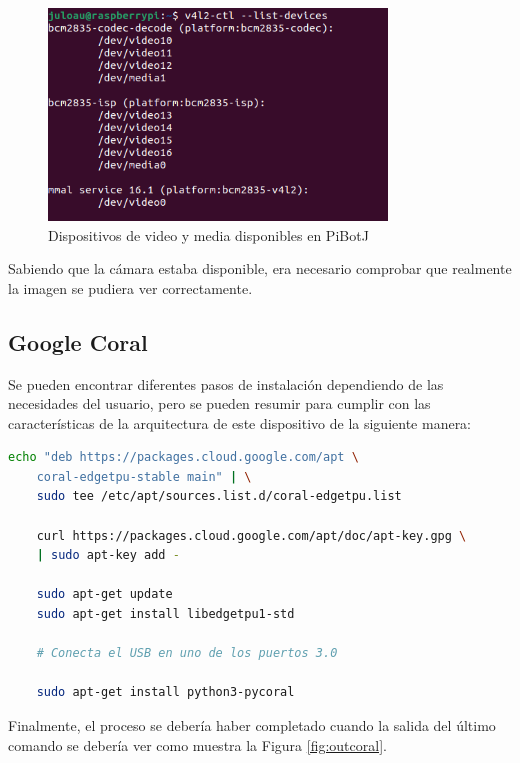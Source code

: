 \begin{figure} [h!]
	\begin{center}
		\includegraphics[width=9cm]{figs/cap6/vl.png}
	\end{center}
	\caption{Dispositivos de video y media disponibles en PiBotJ}
	\label{fig:v4l2}
\end{figure}


Sabiendo que la cámara estaba disponible, era necesario comprobar que realmente la imagen se pudiera ver correctamente.


\subsection*{Google Coral}
\label{subsec:anexogooglecoral}

Se pueden encontrar diferentes pasos de instalación dependiendo de las necesidades del usuario, pero se pueden resumir para cumplir con las características de la arquitectura de este dispositivo de la siguiente manera:


\begin{lstlisting}[language=bash]
	echo "deb https://packages.cloud.google.com/apt \
	coral-edgetpu-stable main" | \
	sudo tee /etc/apt/sources.list.d/coral-edgetpu.list
	
	curl https://packages.cloud.google.com/apt/doc/apt-key.gpg \
	| sudo apt-key add -
	
	sudo apt-get update	
	sudo apt-get install libedgetpu1-std
	
	# Conecta el USB en uno de los puertos 3.0
	
	sudo apt-get install python3-pycoral
\end{lstlisting}

Finalmente, el proceso se debería haber completado cuando la salida del último comando se debería ver como muestra la Figura \ref{fig:outcoral}.

